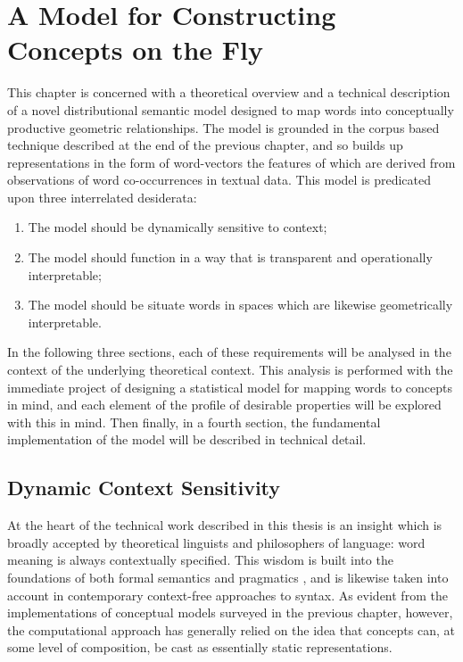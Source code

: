 \chapter{A Model for Constructing Concepts on the Fly}
This chapter is concerned with a theoretical overview and a technical description of a novel distributional semantic model designed to map words into conceptually productive geometric relationships.  The model is grounded in the corpus based technique described at the end of the previous chapter, and so builds up representations in the form of word-vectors the features of which are derived from observations of word co-occurrences in textual data.  This model is predicated upon three interrelated desiderata:

\begin{enumerate}
\item The model should be dynamically sensitive to context;
\item The model should function in a way that is transparent and operationally interpretable;
\item The model should be situate words in spaces which are likewise geometrically interpretable.
\end{enumerate}

In the following three sections, each of these requirements will be analysed in the context of the underlying theoretical context.  This analysis is performed with the immediate project of designing a statistical model for mapping words to concepts in mind, and each element of the profile of desirable properties will be explored with this in mind.  Then finally, in a fourth section, the fundamental implementation of the model will be described in technical detail.

\section{Dynamic Context Sensitivity}
At the heart of the technical work described in this thesis is an insight which is broadly accepted by theoretical linguists and philosophers of language: word meaning is always contextually specified.  This wisdom is built into the foundations of both formal semantics \citep{Montague} and pragmatics \citep{Grice}, and is likewise taken into account in contemporary context-free approaches to syntax.  As evident from the implementations of conceptual models surveyed in the previous chapter, however, the computational approach has generally relied on the idea that concepts can, at some level of composition, be cast as essentially static representations.

